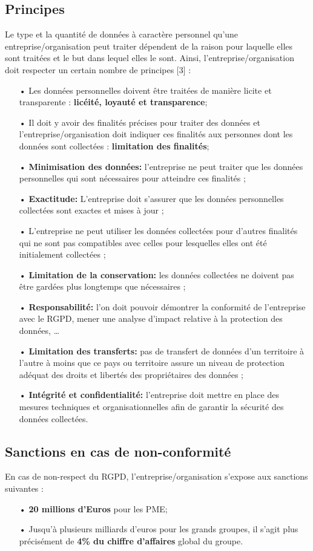 \subsection{Principes}
Le type et la quantité de données à caractère personnel qu’une entreprise/organisation peut traiter dépendent de la raison pour laquelle elles sont traitées et le but dans lequel elles le sont. Ainsi, l’entreprise/organisation doit respecter un certain nombre de principes [3] :
\begin{itemize}
   \item[•] Les données personnelles doivent être traitées de manière licite et transparente : \textbf{licéité, loyauté et transparence};
   \item[•] Il doit y avoir des finalités précises pour traiter des données et l’entreprise/organisation doit indiquer ces finalités aux personnes dont les données sont collectées : \textbf{limitation des finalités};
   \item[•] \textbf{Minimisation des données:} l’entreprise ne peut traiter que les données personnelles qui sont nécessaires pour atteindre ces finalités ;
   \item[•] \textbf{Exactitude:} L’entreprise doit s’assurer que les données personnelles collectées sont exactes et mises à jour ;
   \item[•] L’entreprise ne peut utiliser les données collectées pour d’autres finalités qui ne sont pas compatibles avec celles pour lesquelles elles ont été initialement collectées ;
   \item[•] \textbf{Limitation de la conservation:} les données collectées ne doivent pas être gardées plus longtemps que nécessaires ;
   \item[•] \textbf{Responsabilité:} l’on doit pouvoir démontrer la conformité de l’entreprise avec le RGPD, mener une analyse d’impact relative à la protection des données, …
   \item[•] \textbf{Limitation des transferts:} pas de transfert de données d’un territoire à l’autre à moins que ce pays ou territoire assure un niveau de protection adéquat des droits et libertés des propriétaires des données ;
   \item[•] \textbf{Intégrité et confidentialité:} l’entreprise doit mettre en place des mesures techniques et organisationnelles afin de garantir la sécurité des données collectées.
\end{itemize}
\subsection{Sanctions en cas de non-conformité}
En cas de non-respect du RGPD, l’entreprise/organisation s’expose aux sanctions suivantes :
\begin{itemize}
  \item[•] \textbf{20 millions d'Euros} pour les PME;
  \item[•] Jusqu’à plusieurs milliards d’euros pour les grands groupes, il s’agit plus précisément de \textbf{4\% du chiffre d'affaires} global du groupe.
\end{itemize}


